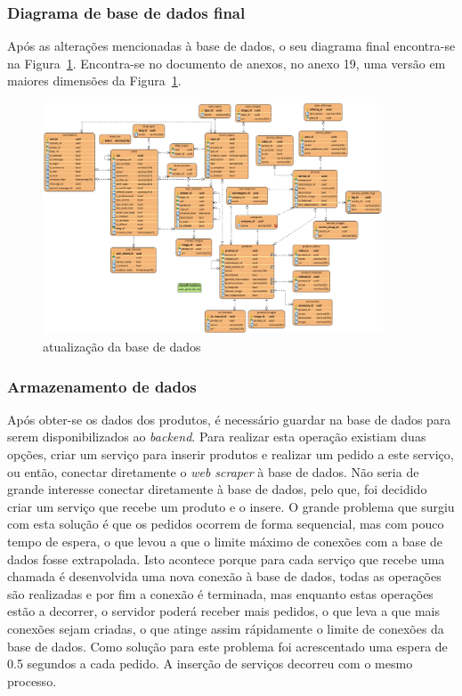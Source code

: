 \subsubsection{Diagrama de base de dados final}

Após as alterações mencionadas à base de dados, o seu diagrama final encontra-se na Figura~\ref{webscraper_bd}. Encontra-se no documento de anexos, no anexo 19, uma versão em maiores dimensões da Figura~\ref*{webscraper_bd}.

\begin{figure}[htb]
  \centering
  \includegraphics[width=0.9\textwidth]{images/diagramas/bd_final.png}
  \caption{atualização da base de dados}
  \label{webscraper_bd}
\end{figure}


\subsubsection{Armazenamento de dados}

Após obter-se os dados dos produtos, é necessário guardar na base de dados para serem disponibilizados ao \textit{backend}. Para realizar esta operação existiam duas opções, criar um serviço para inserir produtos e realizar um pedido a este serviço, ou então, conectar diretamente o \textit{web scraper} à base de dados. Não seria de grande interesse conectar diretamente à base de dados, pelo que, foi decidido criar um serviço que recebe um produto e o insere. O grande problema que surgiu com esta solução é que os pedidos ocorrem de forma sequencial, mas com pouco tempo de espera, o que levou a que o limite máximo de conexões com a base de dados fosse extrapolada. Isto acontece porque para cada serviço que recebe uma chamada é desenvolvida uma nova conexão à base de dados, todas as operações são realizadas e por fim a conexão é terminada, mas enquanto estas operações estão a decorrer, o servidor poderá receber mais pedidos, o que leva a que mais conexões sejam criadas, o que atinge assim rápidamente o limite de conexões da base de dados. Como solução para este problema foi acrescentado uma espera de 0.5 segundos a cada pedido. A inserção de serviços decorreu com o mesmo processo.

